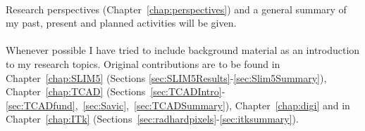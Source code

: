 \\ Research perspectives (Chapter~\ref{chap:perspectives}) and a general summary of my past, present 
and planned activities will be given.
\\
\\
Whenever possible I have tried to include background material as an introduction to my research topics. 
Original contributions are to be found in Chapter~\ref{chap:SLIM5} (Sections \ref{sec:SLIM5Results}-\ref{sec:Slim5Summary}), Chapter~\ref{chap:TCAD} (Sections~\ref{sec:TCADIntro}-\ref{sec:TCADfund},~\ref{sec:Savic},~\ref{sec:TCADSummary}), Chapter~\ref{chap:digi} and in 
Chapter~\ref{chap:ITk} (Sections~\ref{sec:radhardpixels}-\ref{sec:itksummary}).



